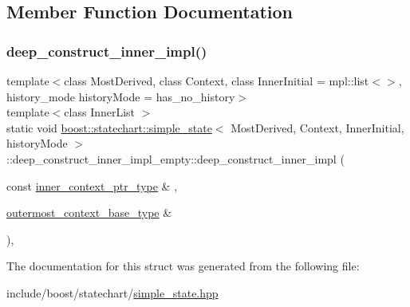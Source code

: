 \subsection{Member Function Documentation}
\mbox{\label{structboost_1_1statechart_1_1simple__state_1_1deep__construct__inner__impl__empty_a0d7459c5a6ad00dc420937a21fb989e0}} 
\subsubsection{\texorpdfstring{deep\+\_\+construct\+\_\+inner\+\_\+impl()}{deep\_construct\_inner\_impl()}}
{\footnotesize\ttfamily template$<$class Most\+Derived, class Context, class Inner\+Initial = mpl\+::list$<$$>$, history\+\_\+mode history\+Mode = has\+\_\+no\+\_\+history$>$ \\
template$<$class Inner\+List $>$ \\
static void \mbox{\hyperlink{classboost_1_1statechart_1_1simple__state}{boost\+::statechart\+::simple\+\_\+state}}$<$ Most\+Derived, Context, Inner\+Initial, history\+Mode $>$\+::deep\+\_\+construct\+\_\+inner\+\_\+impl\+\_\+empty\+::deep\+\_\+construct\+\_\+inner\+\_\+impl (\begin{DoxyParamCaption}\item[{const \mbox{\hyperlink{classboost_1_1statechart_1_1simple__state_ad6d3233a11a23e91b4cc9edcae799379}{inner\+\_\+context\+\_\+ptr\+\_\+type}} \&}]{,  }\item[{\mbox{\hyperlink{classboost_1_1statechart_1_1simple__state_a50f21d7a7d6632eb34430e74cbad3197}{outermost\+\_\+context\+\_\+base\+\_\+type}} \&}]{ }\end{DoxyParamCaption})\hspace{0.3cm}{\ttfamily [inline]}, {\ttfamily [static]}}



The documentation for this struct was generated from the following file\+:\begin{DoxyCompactItemize}
\item 
include/boost/statechart/\mbox{\hyperlink{simple__state_8hpp}{simple\+\_\+state.\+hpp}}\end{DoxyCompactItemize}
